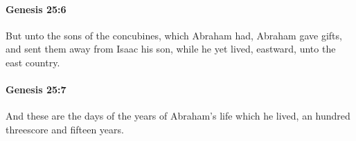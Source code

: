 		\paragraph{Genesis 25:6} %
			\label{GENESIS-25-6}

			But unto the sons of the concubines, which Abraham had, Abraham gave gifts, and sent them away from Isaac his son, while he yet lived, eastward, unto the east country.


		\paragraph{Genesis 25:7} %
			\label{GENESIS-25-7}

			And these are the days of the years of Abraham's life which he lived, an hundred threescore and fifteen years.


